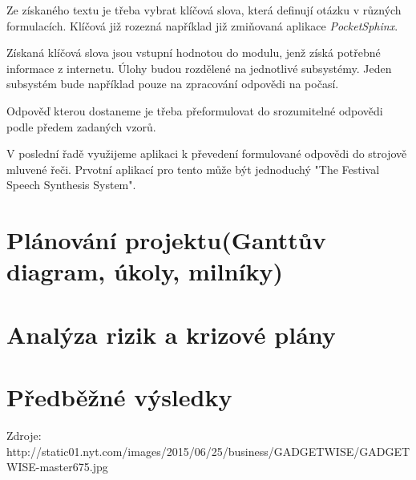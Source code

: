 \documentclass[12pt,a4paper]{article}
\begin{document}
Ze získaného textu je třeba vybrat klíčová slova, která definují otázku v různých formulacích. Klíčová již rozezná například již zmiňovaná aplikace \textit{PocketSphinx}.


Získaná klíčová slova jsou vstupní hodnotou do modulu, jenž získá potřebné informace z internetu. Úlohy budou rozdělené na jednotlivé subsystémy. Jeden subsystém bude například pouze na zpracování odpovědi na počasí. 

Odpověď kterou dostaneme je třeba přeformulovat do srozumitelné odpovědi podle předem zadaných vzorů. 

V poslední řadě využijeme aplikaci k převedení formulované odpovědi do strojově mluvené řeči. Prvotní aplikací pro tento může být jednoduchý "The Festival Speech Synthesis System".



\section*{Plánování projektu(Ganttův diagram, úkoly, milníky)}

\section*{Analýza rizik a krizové plány}

\section*{Předběžné výsledky}

Zdroje:
http://static01.nyt.com/images/2015/06/25/business/GADGETWISE/GADGETWISE-master675.jpg
\end{document}
